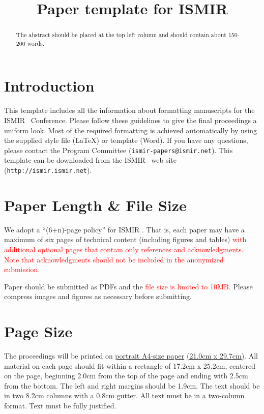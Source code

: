 \documentclass{article}
\title{Paper template for ISMIR \conferenceyear}
\begin{document}
%
\maketitle
%
\begin{abstract}
The abstract should be placed at the top left column and should contain about 150-200 words.
\end{abstract}
%
\section{Introduction}\label{sec:introduction}

This template includes all the information about formatting manuscripts for the ISMIR \conferenceyear\ Conference.
Please follow these guidelines to give the final proceedings a uniform look.
Most of the required formatting is achieved automatically by using the supplied
style file (\LaTeX) or template (Word).
If you have any questions, please contact the Program Committee (\texttt{ismir\conferenceyear-papers@ismir.net}).
This template can be downloaded from the ISMIR \conferenceyear\ web site (\texttt{http://ismir\conferenceyear.ismir.net}).
%
\section{Paper Length \& File Size}
We adopt a ``(6+n)-page policy'' for ISMIR \conferenceyear. That is, each paper may have a maximum of six pages of technical content (including figures and tables) \textcolor{red}{with additional optional pages that contain only references and acknowledgments. Note that acknowledgments should not be included in the anonymized submission.}

Paper should be submitted as PDFs and the \textcolor{red}{file size is limited to 10MB}. Please compress images and figures as necessary before submitting.

\section{Page Size}\label{sec:page_size}

The proceedings will be printed on
 \underline{portrait A4-size paper} \underline{(21.0cm x 29.7cm)}.
All material on each page should fit within a rectangle of 17.2cm x 25.2cm,
centered on the page, beginning 2.0cm
from the top of the page and ending with 2.5cm from the bottom.
The left and right margins should be 1.9cm.
The text should be in two 8.2cm columns with a 0.8cm gutter.
All text must be in a two-column format.
Text must be fully justified.
\end{document}
